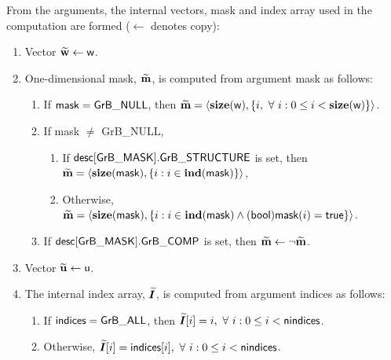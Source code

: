 From the arguments, the internal vectors, mask and index array used in 
the computation are formed ($\leftarrow$ denotes copy):
\begin{enumerate}
	\item Vector ${\bf \widetilde{w}} \leftarrow {\sf w}$.

	\item One-dimensional mask, ${\bf \widetilde{m}}$, is computed from 
    argument {\sf mask} as follows:
	\begin{enumerate}
		\item If ${\sf mask} = {\sf GrB\_NULL}$, then ${\bf \widetilde{m}} = 
        \langle \bold{size}({\sf w}), \{i, \ \forall \ i : 0 \leq i < 
        \bold{size}({\sf w}) \} \rangle$.

		\item If {\sf mask} $\ne$ {\sf GrB\_NULL},  
        \begin{enumerate}
            \item If ${\sf desc[GrB\_MASK].GrB\_STRUCTURE}$ is set, then
            ${\bf \widetilde{m}} = 
            \langle \bold{size}({\sf mask}), \{i : i \in \bold{ind}({\sf mask}) \} \rangle$,
            \item Otherwise, ${\bf \widetilde{m}} = 
            \langle \bold{size}({\sf mask}), \{i : i \in \bold{ind}({\sf mask}) \wedge
            ({\sf bool}){\sf mask}(i) = {\sf true} \} \rangle$.
        \end{enumerate}

		\item	If ${\sf desc[GrB\_MASK].GrB\_COMP}$ is set, then 
        ${\bf \widetilde{m}} \leftarrow \neg {\bf \widetilde{m}}$.
	\end{enumerate}

	\item Vector ${\bf \widetilde{u}} \leftarrow {\sf u}$.
    
    \item The internal index array, $\bm{\widetilde{I}}$, is computed from 
    argument {\sf indices} as follows:
	\begin{enumerate}
		\item	If ${\sf indices} = {\sf GrB\_ALL}$, then 
        $\bm{\widetilde{I}}[i] = i, \ \forall \ i : 0 \leq i < {\sf nindices}$.

		\item	Otherwise, $\bm{\widetilde{I}}[i] = {\sf indices}[i], 
        \ \forall \ i : 0 \leq i < {\sf nindices}$.
    \end{enumerate}
\end{enumerate}

